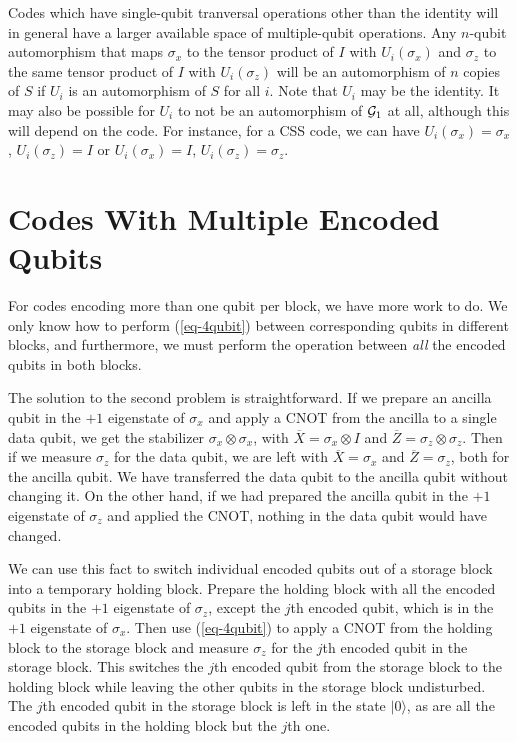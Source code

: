 \documentclass{report}
\newcommand{\G}{{\cal G}}
\newcommand{\ket}[1]{|{#1}\rangle}
\newcommand{\X}{\sigma_x}
\newcommand{\Z}{\sigma_z}
\newcommand{\Xbar}{\overline{X}}
\newcommand{\Zbar}{\overline{Z}}
\begin{document}
Codes which have single-qubit tranversal operations other than the 
identity will in general have a larger available space of multiple-qubit 
operations.  Any $n$-qubit automorphism that maps $\X$ to the tensor 
product of $I$ with $U_i (\X)$ and $\Z$ to the same tensor product of $I$ 
with $U_i (\Z)$ will be an automorphism of $n$ copies of $S$ if $U_i$ is an 
automorphism of $S$ for all $i$.  Note that $U_i$ may be the identity.  It 
may also be possible for $U_i$ to not be an automorphism of $\G_1$ at all, 
although this will depend on the code.  For instance, for a CSS code, we can 
have $U_i (\X) = \X$, $U_i (\Z) = I$ or $U_i (\X) = I$, $U_i (\Z) = \Z$.

\section{Codes With Multiple Encoded Qubits}
\label{sec-multiple}

For codes encoding more than one qubit per block, we have more work to 
do.  We only know how to perform (\ref{eq-4qubit}) between 
corresponding qubits in different blocks, and furthermore, we must 
perform the operation between {\em all} the encoded qubits in both 
blocks.

The solution to the second problem is straightforward.  If we prepare an 
ancilla qubit in the $+1$ eigenstate of $\X$ and apply a CNOT from the 
ancilla to a single data qubit, we get the stabilizer $\X \otimes \X$, with 
$\Xbar = \X \otimes I$ and $\Zbar = \Z \otimes \Z$.  Then if we measure 
$\Z$ for the data qubit, we are left with $\Xbar = \X$ and $\Zbar = \Z$, 
both for the ancilla qubit.  We have transferred the data qubit to the 
ancilla qubit without changing it.  On the other hand, if we had prepared 
the ancilla qubit in the $+1$ eigenstate of $\Z$ and applied the CNOT, 
nothing in the data qubit would have changed.

We can use this fact to switch individual encoded qubits out of a storage 
block into a temporary holding block.  Prepare the holding block with all 
the encoded qubits in the $+1$ eigenstate of $\Z$, except the $j$th encoded 
qubit, which is in the $+1$ eigenstate of $\X$.  Then use (\ref{eq-4qubit}) 
to apply a CNOT from the holding block to the storage block and measure $\Z$ 
for the $j$th encoded qubit in the storage block.  This switches the $j$th 
encoded qubit from the storage block to the holding block while leaving the 
other qubits in the storage block undisturbed.  The $j$th encoded qubit in the 
storage block is left in the state $\ket{0}$, as are all the encoded 
qubits in the holding block but the $j$th one.
\end{document}

